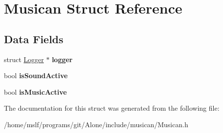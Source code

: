 \hypertarget{struct_musican}{}\section{Musican Struct Reference}
\label{struct_musican}
\subsection*{Data Fields}
\begin{DoxyCompactItemize}
\item 
\hypertarget{struct_musican_af4d650f26e6e1a4b53c751abc1eff45e}{}\label{struct_musican_af4d650f26e6e1a4b53c751abc1eff45e} 
struct \hyperlink{struct_logger}{Logger} $\ast$ {\bfseries logger}
\item 
\hypertarget{struct_musican_a5c6626343a76aeeea67da93f5e14fd45}{}\label{struct_musican_a5c6626343a76aeeea67da93f5e14fd45} 
bool {\bfseries is\+Sound\+Active}
\item 
\hypertarget{struct_musican_abc26db848e0a6faf8a443fefaeb42f50}{}\label{struct_musican_abc26db848e0a6faf8a443fefaeb42f50} 
bool {\bfseries is\+Music\+Active}
\end{DoxyCompactItemize}


The documentation for this struct was generated from the following file\+:\begin{DoxyCompactItemize}
\item 
/home/mslf/programs/git/\+Alone/include/musican/Musican.\+h\end{DoxyCompactItemize}
